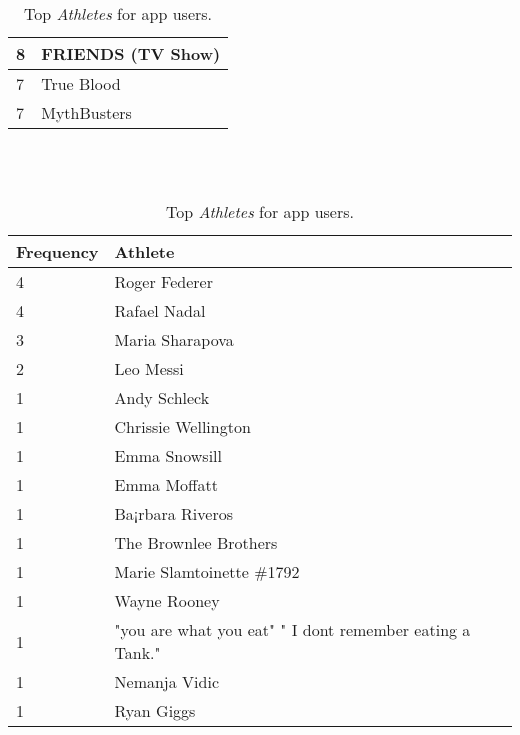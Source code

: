 \begin{table}[h]
\begin{minipage}[b]{.50\textwidth}
\begin{tabular}{|l|l|}
		8 & FRIENDS (TV Show) \\ \hline
		7 & True Blood \\ \hline
		7 & MythBusters \\ \hline
  \end{tabular}
  \caption{Top \emph{Television} shows for app users.}
\end{minipage}
\\
\\
\begin{minipage}[b]{1.0\textwidth}
\centering
  \begin{tabular}{|l|l|} %
  \hline
  		\textbf{Frequency} & \textbf{Athlete} \\ \hline
  		4 & Roger Federer \\ \hline
		4 & Rafael Nadal \\ \hline
		3 & Maria Sharapova \\ \hline
		2 & Leo Messi \\ \hline
		1 & Andy Schleck \\ \hline
		1 & Chrissie Wellington \\ \hline
		1 & Emma Snowsill \\ \hline
		1 & Emma Moffatt \\ \hline
		1 & Ba¡rbara Riveros \\ \hline
		1 & The Brownlee Brothers \\ \hline
		1 & Marie Slamtoinette \#1792 \\ \hline
		1 & Wayne Rooney \\ \hline
		1 & "you are what you eat" " I dont remember eating a Tank." \\ \hline
		1 & Nemanja Vidic \\ \hline
		1 & Ryan Giggs \\ \hline
  \end{tabular}
  \caption{Top \emph{Athletes} for app users.}
\end{minipage}
\end{table}
